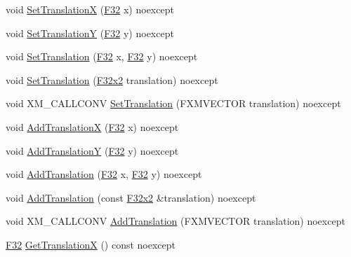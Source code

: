 \begin{DoxyCompactItemize}
\item 
void \hyperlink{classmage_1_1_texture_transform_a27831f1102666269024706d42e1b79b0}{Set\+TranslationX} (\hyperlink{namespacemage_aa97e833b45f06d60a0a9c4fc22ae02c0}{F32} x) noexcept
\item 
void \hyperlink{classmage_1_1_texture_transform_a3c8d11ee771bab59e7960c616ff7261e}{Set\+TranslationY} (\hyperlink{namespacemage_aa97e833b45f06d60a0a9c4fc22ae02c0}{F32} y) noexcept
\item 
void \hyperlink{classmage_1_1_texture_transform_aeda73ef35d04ceeb93f29b2e6a16274b}{Set\+Translation} (\hyperlink{namespacemage_aa97e833b45f06d60a0a9c4fc22ae02c0}{F32} x, \hyperlink{namespacemage_aa97e833b45f06d60a0a9c4fc22ae02c0}{F32} y) noexcept
\item 
void \hyperlink{classmage_1_1_texture_transform_ad8d376195941d77086c9ffdb7d49aaf1}{Set\+Translation} (\hyperlink{namespacemage_aa87237ad091f5cd7da612b8523fc108f}{F32x2} translation) noexcept
\item 
void X\+M\+\_\+\+C\+A\+L\+L\+C\+O\+NV \hyperlink{classmage_1_1_texture_transform_ad78b5f8482dd2a70ac7cde0aa5877f8c}{Set\+Translation} (F\+X\+M\+V\+E\+C\+T\+OR translation) noexcept
\item 
void \hyperlink{classmage_1_1_texture_transform_a17719b07810b45e0c669a6c6baff345d}{Add\+TranslationX} (\hyperlink{namespacemage_aa97e833b45f06d60a0a9c4fc22ae02c0}{F32} x) noexcept
\item 
void \hyperlink{classmage_1_1_texture_transform_a4c9463ef0b5f3730560093d03b31de15}{Add\+TranslationY} (\hyperlink{namespacemage_aa97e833b45f06d60a0a9c4fc22ae02c0}{F32} y) noexcept
\item 
void \hyperlink{classmage_1_1_texture_transform_a759b5363ddc7621b422ebdc90c9e17af}{Add\+Translation} (\hyperlink{namespacemage_aa97e833b45f06d60a0a9c4fc22ae02c0}{F32} x, \hyperlink{namespacemage_aa97e833b45f06d60a0a9c4fc22ae02c0}{F32} y) noexcept
\item 
void \hyperlink{classmage_1_1_texture_transform_a15f6db6139ba44a3db07f43cce4c1137}{Add\+Translation} (const \hyperlink{namespacemage_aa87237ad091f5cd7da612b8523fc108f}{F32x2} \&translation) noexcept
\item 
void X\+M\+\_\+\+C\+A\+L\+L\+C\+O\+NV \hyperlink{classmage_1_1_texture_transform_aa8a4a8d6dec5386a9e83b0c48c30a90a}{Add\+Translation} (F\+X\+M\+V\+E\+C\+T\+OR translation) noexcept
\item 
\hyperlink{namespacemage_aa97e833b45f06d60a0a9c4fc22ae02c0}{F32} \hyperlink{classmage_1_1_texture_transform_a94d51c47a75024fadfd849fc45e5268d}{Get\+TranslationX} () const noexcept

\end{DoxyCompactItemize}
